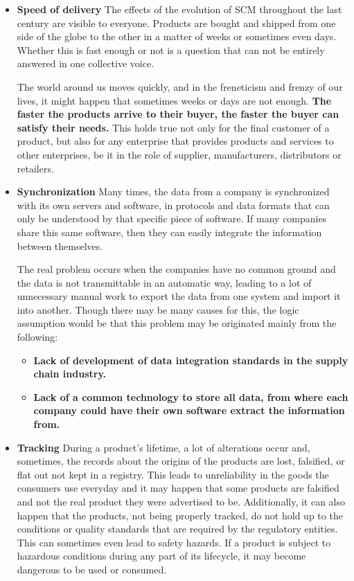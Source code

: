 \begin{itemize}
\item \textbf{Speed of delivery}
The effects of the evolution of SCM throughout the last century are visible to everyone. Products are bought and shipped from one side of the globe to the other in a matter of weeks or sometimes even days. Whether this is fast enough or not is a question that can not be entirely answered in one collective voice. 

The world around us moves quickly, and in the freneticism and frenzy of our lives, it might happen that sometimes weeks or days are not enough. \textbf{The faster the products arrive to their buyer, the faster the buyer can satisfy their needs.} This holds true not only for the final customer of a product, but also for any enterprise that provides products and services to other enterprises, be it in the role of supplier, manufacturers, distributors or retailers.

\item \textbf{Synchronization}
Many times, the data from a company is synchronized with its own servers and software, in protocols and data formats that can only be understood by that specific piece of software. If many companies share this same software, then they can easily integrate the information between themselves.

The real problem occurs when the companies have no common ground and the data is not transmittable in an automatic way, leading to a lot of unnecessary manual work to export the data from one system and import it into another. Though there may be many causes for this, the logic assumption would be that this problem may be originated mainly from the following:

\begin{itemize}
\item \textbf{Lack of development of data integration standards in the supply chain industry.}
\item \textbf{Lack of a common technology to store all data, from where each company could have their own software extract the information from.}
\end{itemize}

\item \textbf{Tracking}
During a product's lifetime, a lot of alterations occur and, sometimes, the records about the origins of the products are lost, falsified, or flat out not kept in a registry. This leads to unreliability in the goods the consumers use everyday and it may happen that some products are falsified and not the real product they were advertised to be. Additionally, it can also happen that the products, not being properly tracked, do not hold up to the conditions or quality standards that are required by the regulatory entities. This can sometimes even lead to safety hazards. If a product is subject to hazardous conditions during any part of its lifecycle, it may become dangerous to be used or consumed.


\end{itemize}
